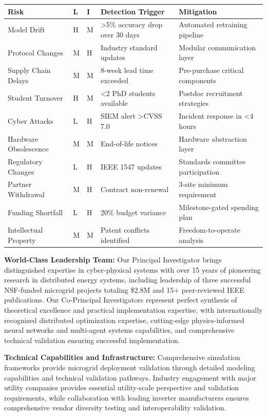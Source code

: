 \documentclass[12pt]{article}
\begin{document}
\begin{center}
\footnotesize
\begin{tabular}{|p{2cm}|p{0.8cm}|p{0.8cm}|p{2.5cm}|p{2.5cm}|}
\hline
\textbf{Risk} & \textbf{L} & \textbf{I} & \textbf{Detection Trigger} & \textbf{Mitigation} \\
\hline
Model Drift & H & M & >5\% accuracy drop over 30 days & Automated retraining pipeline \\
Protocol Changes & M & H & Industry standard updates & Modular communication layer \\
Supply Chain Delays & M & M & 8-week lead time exceeded & Pre-purchase critical components \\
Student Turnover & H & M & <2 PhD students available & Postdoc recruitment strategies \\
Cyber Attacks & L & H & SIEM alert >CVSS 7.0 & Incident response in <4 hours \\
Hardware Obsolescence & M & M & End-of-life notices & Hardware abstraction layer \\
Regulatory Changes & L & H & IEEE 1547 updates & Standards committee participation \\
Partner Withdrawal & M & H & Contract non-renewal & 3-site minimum requirement \\
Funding Shortfall & L & H & 20\% budget variance & Milestone-gated spending plan \\
Intellectual Property & M & M & Patent conflicts identified & Freedom-to-operate analysis \\
\hline
\end{tabular}
\end{center}

\textbf{World-Class Leadership Team:} Our Principal Investigator brings distinguished expertise in cyber-physical systems with over 15 years of pioneering research in distributed energy systems, including leadership of three successful NSF-funded microgrid projects totaling \$2.8M and 15+ peer-reviewed IEEE publications. Our Co-Principal Investigators represent perfect synthesis of theoretical excellence and practical implementation expertise, with internationally recognized distributed optimization expertise, cutting-edge physics-informed neural networks and multi-agent systems capabilities, and comprehensive technical validation ensuring successful implementation.

\textbf{Technical Capabilities and Infrastructure:} Comprehensive simulation frameworks provide microgrid deployment validation through detailed modeling capabilities and technical validation pathways. Industry engagement with major utility companies provides essential utility-scale perspective and validation requirements, while collaboration with leading inverter manufacturers ensures comprehensive vendor diversity testing and interoperability validation.
\end{document}
